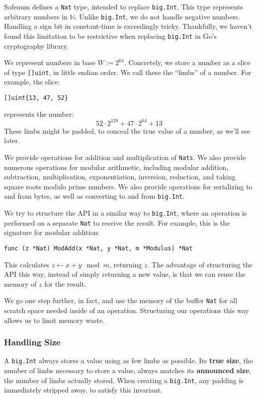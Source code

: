 \documentclass[11pt, a4paper]{article} %
\begin{document}
{Safenum defines a \texttt{Nat} type, intended to
replace \texttt{big.Int}. This type represents arbitrary
numbers in $\mathbb{N}$. Unlike \texttt{big.Int}, we do not handle
negative numbers. Handling a sign bit in constant-time is exceedingly
tricky. Thankfully, we haven't found this limitation to be restrictive
when replacing \texttt{big.Int} in Go's cryptography library.

We represent numbers in base $W := 2^{64}$. Concretely, we
store a number as a slice of type \texttt{[]uint}, in little
endian order. We call these the \enquote{limbs} of a number. For example,
the slice:
\begin{verbatim}
[]uint{13, 47, 52}
\end{verbatim}
represents the number:
$$
52 \cdot 2^{128} + 47 \cdot 2^{64} + 13
$$
These limbs might be padded, to conceal the true value of a number,
as we'll see later.

We provide operations for addition and multiplication of \texttt{Nats}.
We also provide numerous operations
for modular arithmetic, including modular addition, subtraction,
multiplication, exponentiation, inversion, reduction, and taking
square roots modulo prime numbers. We also provide operations
for serializing to and from bytes, as well as converting
to and from \texttt{big.Int}.

We try to structure the API in a similar way to \texttt{big.Int},
where an operation is performed on a separate
\texttt{Nat} to receive the result.
For example, this is the signature for
modular addition:

\begin{verbatim}
func (z *Nat) ModAdd(x *Nat, y *Nat, m *Modulus) *Nat
\end{verbatim}

This calculates $z \leftarrow x + y \mod m$, returning $z$. The advantage
of structuring the API this way, instead of simply returning a new
value, is that we can reuse the memory of $z$ for the result.

We go one step further, in fact, and use the memory of the buffer
\texttt{Nat} for all scratch space needed inside of an operation.
Structuring our operations this way allows us to limit memory waste.

\subsubsection{Handling Size}

A \texttt{big.Int} always stores a value using as few limbs
as possible. Its \textbf{true size}, the number of limbs
necessary to store a value, always matches its \textbf{announced size},
the number of limbs actually stored. When creating
a \texttt{big.Int}, any padding is immediately stripped away,
to satisfy this invariant.

}
\end{document}
